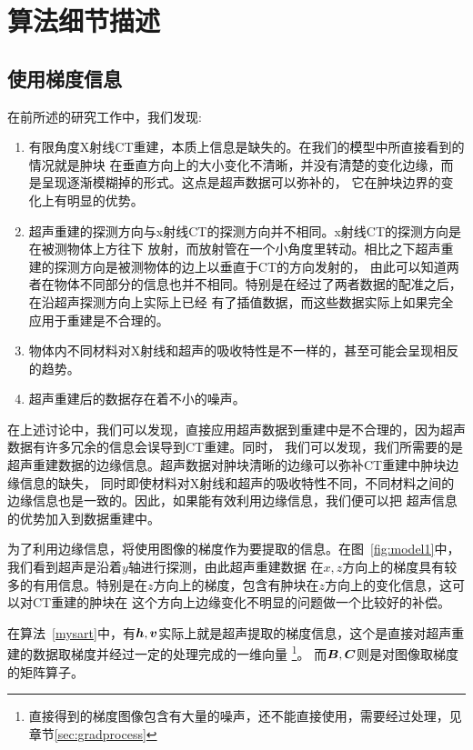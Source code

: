 \section{算法细节描述}
\subsection{使用梯度信息}\label{sec:mysart}
在前所述的研究工作中，我们发现:
\begin{enumerate}
    \item 有限角度X射线CT重建，本质上信息是缺失的。在我们的模型中所直接看到的情况就是肿块
    在垂直方向上的大小变化不清晰，并没有清楚的变化边缘，而是呈现逐渐模糊掉的形式。这点是超声数据可以弥补的，
    它在肿块边界的变化上有明显的优势。
    \item 超声重建的探测方向与x射线CT的探测方向并不相同。x射线CT的探测方向是在被测物体上方往下
    放射，而放射管在一个小角度里转动。相比之下超声重建的探测方向是被测物体的边上以垂直于CT的方向发射的，
    由此可以知道两者在物体不同部分的信息也并不相同。特别是在经过了两者数据的配准之后，在沿超声探测方向上实际上已经
    有了插值数据，而这些数据实际上如果完全应用于重建是不合理的。
    \item 物体内不同材料对X射线和超声的吸收特性是不一样的，甚至可能会呈现相反的趋势。
    \item 超声重建后的数据存在着不小的噪声。
\end{enumerate}
在上述讨论中，我们可以发现，直接应用超声数据到重建中是不合理的，因为超声数据有许多冗余的信息会误导到CT重建。同时，
我们可以发现，我们所需要的是超声重建数据的边缘信息。超声数据对肿块清晰的边缘可以弥补CT重建中肿块边缘信息的缺失，
同时即使材料对X射线和超声的吸收特性不同，不同材料之间的边缘信息也是一致的。因此，如果能有效利用边缘信息，我们便可以把
超声信息的优势加入到数据重建中。

为了利用边缘信息，将使用图像的梯度作为要提取的信息。在图~\ref{fig:model1}中，我们看到超声是沿着$y$轴进行探测，由此超声重建数据
在$x,z$方向上的梯度具有较多的有用信息。特别是在$z$方向上的梯度，包含有肿块在$z$方向上的变化信息，这可以对CT重建的肿块在
这个方向上边缘变化不明显的问题做一个比较好的补偿。

在算法~\ref{mysart}中，有$\bm{h},\bm{v}$实际上就是超声提取的梯度信息，这个是直接对超声重建的数据取梯度并经过一定的处理完成的一维向量
\footnote{直接得到的梯度图像包含有大量的噪声，还不能直接使用，需要经过处理，见章节\ref{sec:gradprocess}}。
而$\bm{B},\bm{C} $则是对图像取梯度的矩阵算子。
\clearpage

